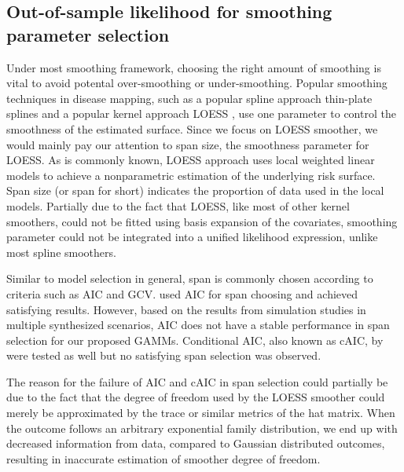 	\subsection{Out-of-sample likelihood for smoothing parameter selection}
	
	Under most smoothing framework, choosing the right amount of smoothing is vital to avoid potental over-smoothing or under-smoothing. Popular smoothing techniques in disease mapping, such as a popular spline approach thin-plate splines \citep{wood2003thin} and a popular kernel approach LOESS \citep{cleveland1979robust}, use one parameter to control the smoothness of the estimated surface. Since we focus on LOESS smoother, we would mainly pay our attention to span size, the smoothness parameter for LOESS. As is commonly known, LOESS approach uses local weighted linear models to achieve a nonparametric estimation of the underlying risk surface. Span size (or span for short) indicates the proportion of data used in the local models. Partially due to the fact that LOESS, like most of other kernel smoothers, could not be fitted using basis expansion of the covariates, smoothing parameter could not be integrated into a unified likelihood expression, unlike most spline smoothers. 
	
	Similar to model selection in general, span is commonly chosen according to criteria such as AIC and GCV. \cite{Tang2020Additive} used AIC for span choosing and achieved satisfying results. However, based on the results from simulation studies in multiple synthesized scenarios, AIC does not have a stable performance in span selection for our proposed GAMMs. Conditional AIC, also known as cAIC, by \cite{vaida2005conditional} were tested as well but no satisfying span selection was observed.
	
	The reason for the failure of AIC and cAIC in span selection could partially be due to the fact that the degree of freedom used by the LOESS smoother could merely be approximated by the trace or similar metrics of the hat matrix. When the outcome follows an arbitrary exponential family distribution, we end up with decreased information from data, compared to Gaussian distributed outcomes, resulting in inaccurate estimation of smoother degree of freedom.
	
